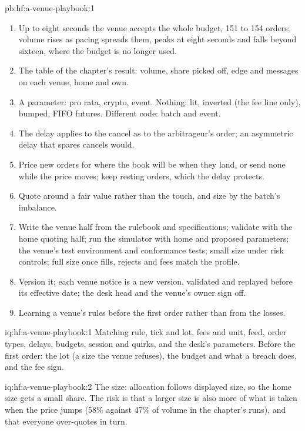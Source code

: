 \begin{solution}{pb:hf:a-venue-playbook:1}
\begin{enumerate}
event (3-tick threshold: 7\,900 units, 238 messages, $-0.57$).
\item Up to eight seconds the venue accepts the whole budget, 151 to 154 orders; volume rises as pacing spreads them, peaks at eight seconds and falls
beyond sixteen, where the budget is no longer used.
\item The table of the chapter's result: volume, share picked off, edge and messages on each venue, home and own.
\item A parameter: pro rata, crypto, event. Nothing: lit, inverted (the fee line only), bumped, FIFO futures. Different code: batch and event.
\item The delay applies to the cancel as to the arbitrageur's order; an asymmetric delay that spares cancels would.
\item Price new orders for where the book will be when they land, or send none while the price moves; keep resting orders, which the delay
protects.
\item Quote around a fair value rather than the touch, and size by the batch's imbalance.
\item Write the venue half from the rulebook and specifications; validate with the home quoting half; run the simulator with home and proposed
parameters; the venue's test environment and conformance tests; small size under risk controls; full size once fills, rejects and fees match the
profile.
\item Version it; each venue notice is a new version, validated and replayed before its effective date; the desk head and the venue's owner sign off.
\item Learning a venue's rules before the first order rather than from the losses.
\end{enumerate}
\end{solution}

\begin{solution}{iq:hf:a-venue-playbook:1}
Matching rule, tick and lot, fees and unit, feed, order types, delays, budgets, session and quirks, and the desk's parameters. Before the first
order: the lot (a size the venue refuses), the budget and what a breach does, and the fee sign.
\end{solution}

\begin{solution}{iq:hf:a-venue-playbook:2}
The size: allocation follows displayed size, so the home size gets a small share. The risk is that a larger size is also more of what is taken when
the price jumps (58\% against 47\% of volume in the chapter's runs), and that everyone over-quotes in turn.
\end{solution}

